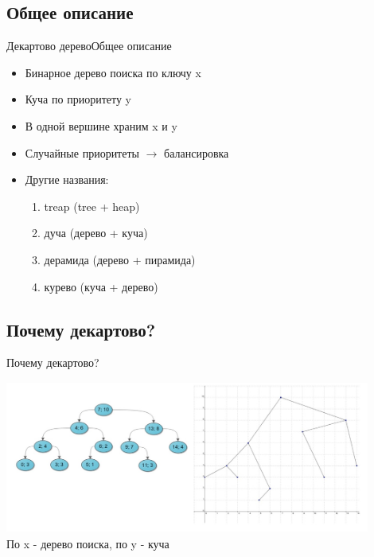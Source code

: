 \documentclass[10pt]{beamer}
\begin{document}
\subsection{Общее описание}
\begin{frame}[fragile]{Декартово дерево}{Общее описание}
\begin{itemize}
    \item Бинарное дерево поиска по ключу x
    \item Куча по приоритету y
    \item В одной вершине храним x и y
    \item Случайные приоритеты $\rightarrow$ балансировка
    \item Другие названия:
    \begin{enumerate}
        \item treap (tree + heap)
        \item дуча (дерево + куча)
        \item дерамида (дерево + пирамида)
        \item курево (куча + дерево)
    \end{enumerate}
\end{itemize}
\end{frame}

\subsection{Почему декартово?}
\begin{frame}[fragile]{Почему декартово?}
\begin{center}
\includegraphics[width=12cm, height=5cm]{Term_1/Source/Pirctures/treap.jpg}
\\
По x - дерево поиска, по y - куча
\end{center}
\end{frame}
\end{document}
